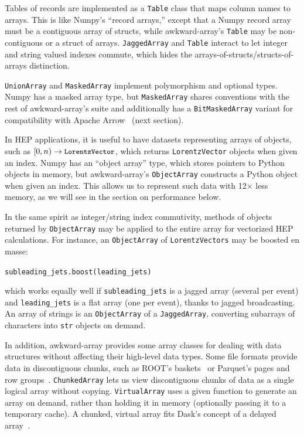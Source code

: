 \documentclass{webofc}
\begin{document}
Tables of records are implemented as a {\tt\small Table} class that maps column names to arrays. This is like Numpy's ``record arrays,'' except that a Numpy record array must be a contiguous array of structs, while awkward-array's {\tt\small Table} may be non-contiguous or a struct of arrays. {\tt\small JaggedArray} and {\tt\small Table} interact to let integer and string valued indexes commute, which hides the arrays-of-structs/structs-of-arrays distinction.

{\tt\small UnionArray} and {\tt\small MaskedArray} implement polymorphism and optional types. Numpy has a masked array type, but {\tt\small MaskedArray} shares conventions with the rest of awkward-array's suite and additionally has a {\tt\small BitMaskedArray} variant for compatibility with Apache Arrow~\cite{arrow} (next section).

In HEP applications, it is useful to have datasets representing arrays of objects, such as $[0, n) \to \mbox{\tt\small LorentzVector}$, which returns \mbox{\tt\small LorentzVector} objects when given an index. Numpy has an ``object array'' type, which stores pointers to Python objects in memory, but awkward-array's {\tt\small ObjectArray} constructs a Python object when given an index. This allows us to represent such data with 12$\times$ less memory, as we will see in the section on performance below.

In the same spirit as integer/string index commutivity, methods of objects returned by {\tt\small ObjectArray} may be applied to the entire array for vectorized HEP calculations. For instance, an {\tt\small ObjectArray} of \mbox{\tt\small LorentzVectors} may be boosted en masse:

\begin{center}
\tt\small subleading\_jets.boost(leading\_jets)
\end{center}

\noindent which works equally well if {\tt\small subleading\_jets} is a jagged array (several per event) and {\tt\small leading\_jets} is a flat array (one per event), thanks to jagged broadcasting. An array of strings is an {\tt\small ObjectArray} of a {\tt\small JaggedArray}, converting subarrays of characters into {\tt\small str} objects on demand.

In addition, awkward-array provides some array classes for dealing with data structures without affecting their high-level data types. Some file formats provide data in discontiguous chunks, such as ROOT's baskets~\cite{root-file} or Parquet's pages and row groups~\cite{parquet-file}. {\tt\small ChunkedArray} lets us view discontiguous chunks of data as a single logical array without copying. {\tt\small VirtualArray} uses a given function to generate an array on demand, rather than holding it in memory (optionally passing it to a temporary cache). A chunked, virtual array fits Dask's concept of a delayed array~\cite{dask}.
\end{document}
